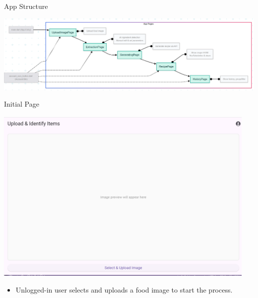 \documentclass{beamer}
\begin{document}
\begin{frame}{App Structure}
    \begin{center}
        \includegraphics[width=1.0\textwidth, height=0.6\textheight]{frontend.png}

    \end{center}
\end{frame}

\begin{frame}{Initial Page}
    \begin{center}
        \includegraphics[width=0.95\textwidth,height=0.58\textheight,keepaspectratio]{initial_page.png}
    \end{center}
    \vspace{2mm}
    \begin{itemize}
        \item \small Unlogged-in user selects and uploads a food image to start the process.
    \end{itemize}
\end{frame}
\end{document}
